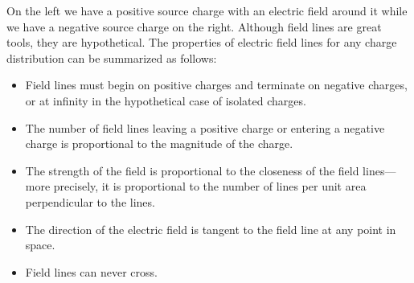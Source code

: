 \documentclass[9pt]{article}
\begin{document}
	On the left we have a positive source charge with an electric field around it while we have a negative source charge on the right. Although field lines are great tools, they are hypothetical. The properties of electric field lines for any charge distribution can be summarized as follows: \begin{itemize}
		\item Field lines must begin on positive charges and terminate on negative charges, or at infinity in the hypothetical case of isolated charges.
		\item The number of field lines leaving a positive charge or entering a negative charge is proportional to the magnitude of the charge.
		\item The strength of the field is proportional to the closeness of the field lines—more precisely, it is proportional to the number of lines per unit area perpendicular to the lines.
		\item The direction of the electric field is tangent to the field line at any point in space.
		\item Field lines can never cross.
	\end{itemize}
	
	
	
	
	
	
	
\end{document}
